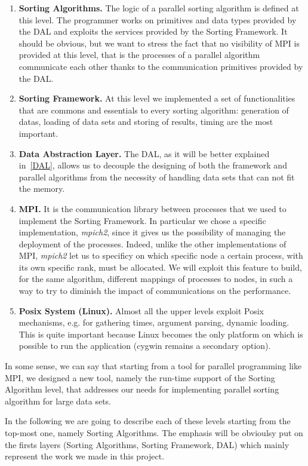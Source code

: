 \begin{enumerate}
\item \textbf{Sorting Algorithms.} The logic of a parallel sorting algorithm is defined at this level. The programmer works on primitives and data types provided by the DAL and exploits the services provided by the Sorting Framework. It should be obvious, but we want to stress the fact that no visibility of MPI is provided at this level, that is the processes of a parallel algorithm communicate each other thanks to the communication primitives provided by the DAL.  
\item \textbf{Sorting Framework.} At this level we implemented a set of functionalities that are commons and essentials to every sorting algorithm: generation of datas, loading of data sets and storing of results, timing are the most important. 
\item \textbf{Data Abstraction Layer.} The DAL, as it will be better explained in~\ref{DAL}, allows us to decouple the designing of both the framework and parallel algorithms from the necessity of handling data sets that can not fit the memory. 
\item \textbf{MPI.} It is the communication library between processes that we used to implement the Sorting Framework. In particular we chose a specific implementation, \textit{mpich2}, since it gives us the possibility of managing the deployment of the processes. Indeed, unlike the other implementations of MPI, \textit{mpich2} let us to specificy on which specific node a certain process, with its own specific rank, must be allocated. We will exploit this feature to build, for the same algorithm, different mappings of processes to nodes, in such a way to try to diminish the impact of communications on the performance. 
\item \textbf{Posix System (Linux).} Almost all the upper levels exploit Posix mechanisms, e.g. for gathering times, argument parsing, dynamic loading. This is quite important because Linux becomes the only platform on which is possible to run the application (cygwin remains a secondary option). 
\end{enumerate}
In some sense, we can say that starting from a tool for parallel programming like MPI, we designed a new tool, namely the run-time support of the Sorting Algorithm level, that addresses our needs for implementing parallel sorting algorithm for large data sets. 

In the following we are going to describe each of these levels starting from the top-most one, namely Sorting Algorithms. The emphasis will be obvioulsy put on the firsts layers (Sorting Algorithms, Sorting Framework, DAL) which mainly represent the work we made in this project.


